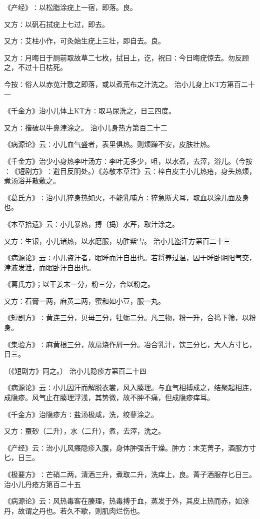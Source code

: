 \documentclass[a4paper,12pt,UTF8,twoside]{ctexbook}
\begin{document}
《产经》∶以松脂涂疣上一宿，即落。良。

又方∶以矾石拭疣上七过，即去。

又方∶艾柱小作，可灸始生疣上三壮，即自去。良。

又方∶月晦日于厕前取故草二七枚，拭目上，讫，祝曰∶今日晦疣惊去。勿反顾之，不过十日枯死。

今按∶俗人以赤苋汁敷之即落，或以煮荒布之汁洗之。
治小儿身上KT方第百二十一

《千金方》治小儿体上KT方∶取马尿洗之，日三四度。

又方∶揩破以牛鼻津涂之。
治小儿身热方第百二十二

《病源论》云∶小儿血气盛者，表里俱热。则烦躁不安，皮肤壮热。

《千金方》治少小身热李叶汤方∶李叶无多少，咀，以水煮，去滓，浴儿。（今按∶《短剧方》∶避目反阴处。）《苏敬本草注》云∶梓白皮主小儿热疮，身头热烦，煮汤浴并散敷之。

《葛氏方》∶治小儿猝身热如火，不能乳哺方∶猝急断犬耳，取血以涂儿面及身也。

《本草拾遗》云∶小儿暴热，搏（捣）水芹，取汁涂之。

又方∶生银，小儿诸热，以水磨服，功胜紫雪。
治小儿盗汗方第百二十三

《病源论》云∶小儿盗汗者，眠睡而汗自出也。若将养过温，因于睡卧阴阳气交，津液发泄，而眠卧汗自出也。

《葛氏方》；以干姜末一分，粉三分，合以粉之。

又方∶石膏一两，麻黄二两，蜜和如小豆，服一丸。

《短剧方》∶黄连三分，贝母三分，牡蛎二分。凡三物，粉一升，合捣下筛，以粉身。

《集验方》∶麻黄根三分，故扇烧作屑一分。冶合乳汁，饮三分匕，大人方寸匕，日三。

（《短剧方》同之。）
治小儿隐疹方第百二十四

《病源论》云∶小儿因汗而解脱衣裳，风入腠理。与血气相搏成之，结聚起相连，成隐疹。风气止在腠理浮浅，其势微，故不肿不痛，但成隐疹痒耳。

《千金方》治隐疹方∶盐汤极咸，洗，绞蓼涂之。

又方∶蚕砂（二升），水（二升），煮，去滓，洗之。

《产经》云∶治小儿风瘙隐疹入腹，身体肿强舌干燥。肿方∶末芜菁子，酒服方寸匕，日三。

《极要方》∶芒硝二两，清酒三升，煮取二升，洗痒上，良。菁子酒服存匕日三。
治小儿丹疮方第百二十五

《病源论》云∶风热毒客在腠理，热毒搏于血，蒸发于外，其皮上热而赤，如涂丹，故谓之丹也。若久不歇，则肌肉烂伤也。
\end{document}
